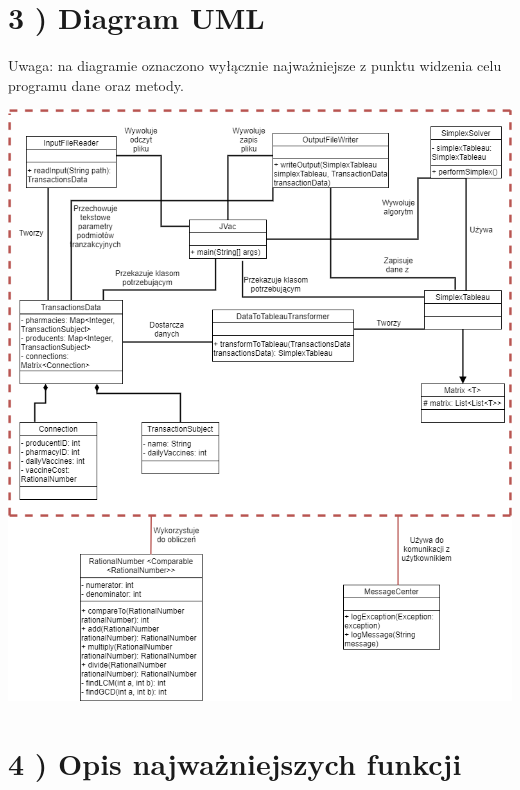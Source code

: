 \documentclass[]{article}
\begin{document}
    \section{3 ) Diagram UML}

    Uwaga: na diagramie oznaczono wyłącznie najważniejsze z punktu widzenia
    celu programu dane oraz metody.

    \includegraphics[scale=0.5]{UML}


    \section{4 ) Opis najważniejszych funkcji}
\end{document}
